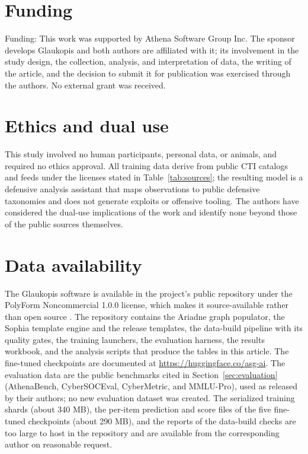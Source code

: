 \documentclass[a4paper,fleqn]{cas-dc}
\begin{document}
\section*{Funding}
Funding: This work was supported by Athena Software Group Inc. The sponsor develops Glaukopis and both authors are affiliated with it; its involvement in the study design, the collection, analysis, and interpretation of data, the writing of the article, and the decision to submit it for publication was exercised through the authors. No external grant was received.

\section*{Ethics and dual use}
This study involved no human participants, personal data, or animals, and required no ethics approval. All training data derive from public CTI catalogs and feeds under the licenses stated in Table~\ref{tab:sources}; the resulting model is a defensive analysis assistant that maps observations to public defensive taxonomies and does not generate exploits or offensive tooling. The authors have considered the dual-use implications of the work and identify none beyond those of the public sources themselves.

\section*{Data availability}
The Glaukopis software is available in the project's public repository under the PolyForm Noncommercial 1.0.0 license, which makes it source-available rather than open source \citep{glaukopis2026software}. The repository contains the Ariadne graph populator, the Sophia template engine and the release templates, the data-build pipeline with its quality gates, the training launchers, the evaluation harness, the results workbook, and the analysis scripts that produce the tables in this article. The fine-tuned checkpoints are documented at \url{https://huggingface.co/asg-ai}. The evaluation data are the public benchmarks cited in Section~\ref{sec:evaluation} (AthenaBench, CyberSOCEval, CyberMetric, and MMLU-Pro), used as released by their authors; no new evaluation dataset was created. The serialized training shards (about 340 MB), the per-item prediction and score files of the five fine-tuned checkpoints (about 290 MB), and the reports of the data-build checks are too large to host in the repository and are available from the corresponding author on reasonable request.
\end{document}
